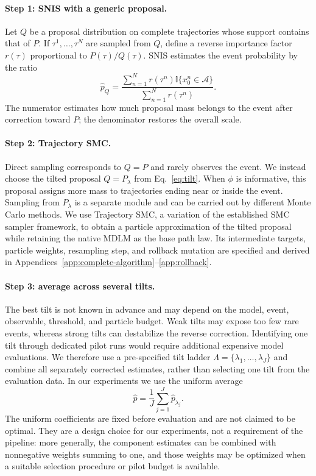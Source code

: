 \documentclass{article}
\newcommand{\ind}{\mathbb{I}}
\newcounter{algorithm}
\begin{document}
\paragraph{Step 1: SNIS with a generic proposal.}
Let $Q$ be a proposal distribution on complete trajectories whose support
contains that of $P$. If $\tau^1,\ldots,\tau^N$ are sampled from $Q$, define a
reverse importance factor $r(\tau)$ proportional to $P(\tau)/Q(\tau)$. SNIS
estimates the event probability by the ratio
\begin{equation}
\widehat p_Q=
\frac{\sum_{n=1}^{N}r(\tau^n)\ind\{x^n_0\in\mathcal A\}}
{\sum_{n=1}^{N}r(\tau^n)}.
\label{eq:generic-snis}
\end{equation}
The numerator estimates how much proposal mass belongs to the event after
correction toward $P$; the denominator restores the overall scale.

\paragraph{Step 2: Trajectory SMC.}
Direct sampling corresponds to $Q=P$ and rarely observes the event. We instead
choose the tilted proposal $Q=P_\lambda$ from Eq.~\eqref{eq:tilt}. When
$\phi$ is informative, this proposal assigns more mass to trajectories ending
near or inside the event. Sampling from $P_\lambda$ is a separate module and
can be carried out by different Monte Carlo methods. We use Trajectory SMC, a
variation of the established SMC sampler framework, to obtain a particle
approximation of the tilted proposal while retaining the native MDLM as the
base path law. Its intermediate targets, particle weights, resampling step,
and rollback mutation are specified and derived in
Appendices~\ref{app:complete-algorithm}--\ref{app:rollback}.

\paragraph{Step 3: average across several tilts.}
The best tilt is not known in advance and may depend on the model, event,
observable, threshold, and particle budget. Weak tilts may expose too few rare
events, whereas strong tilts can destabilize the reverse correction.
Identifying one tilt through dedicated pilot runs would require additional
expensive model evaluations. We therefore use a pre-specified tilt ladder
$\Lambda=\{\lambda_1,\ldots,\lambda_J\}$ and combine all separately corrected
estimates, rather than selecting one tilt from the evaluation data. In our
experiments we use the uniform average
\begin{equation}
\widehat p=\frac{1}{J}\sum_{j=1}^{J}\widehat p_{\lambda_j}.
\label{eq:convex-combination}
\end{equation}
The uniform coefficients are fixed before evaluation and are not claimed to be
optimal. They are a design choice for our experiments, not a requirement of
the pipeline: more generally, the component estimates can be combined with
nonnegative weights summing to one, and those weights may be optimized when a
suitable selection procedure or pilot budget is available.
\end{document}
